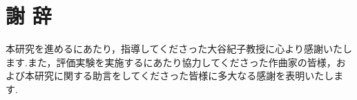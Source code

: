 \chapter*{謝 辞}
本研究を進めるにあたり，指導してくださった大谷紀子教授に心より感謝いたします.また，評価実験を実施するにあたり協力してくださった作曲家の皆様，および本研究に関する助言をしてくださった皆様に多大なる感謝を表明いたします.